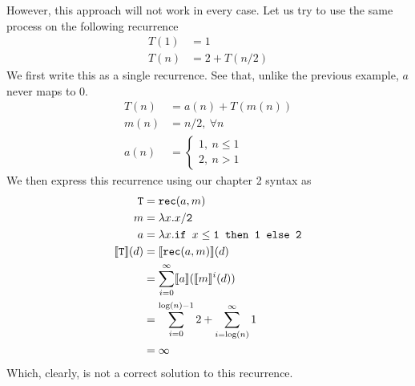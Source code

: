 However, this approach will not work in every case. Let us try to use the same process on the following recurrence
\begin{align*}
T(1) &= 1 \\
T(n) &= 2 + T(n/2) 
\end{align*}
We first write this as a single recurrence. See that, unlike the previous example, $a$ never maps to $0$.
\begin{align*}
T(n) &= a(n) + T(m(n)) \\
m(n) &= n/2, \ \forall n \\ 
a(n) &= 
\begin{cases}
1, \ n \leq 1 \\
2, \ n > 1
\end{cases}
\end{align*}
We then express this recurrence using our chapter 2 syntax as
\begin{align*}
\texttt{T} &= \texttt{rec}(a,m) \\
m &= \lambda x.x/\texttt{2} \\
a &=\lambda x.\texttt{if } x\leq\texttt{1} \texttt{ then } \texttt{1} \texttt{ else } \texttt{2} \\
\llbracket \texttt{T} \rrbracket(d) &= \llbracket \texttt{rec}(a,m) \rrbracket(d) \\
&= \sum_{i=0}^{\infty}\llbracket a \rrbracket(\llbracket m\rrbracket^i(d)) \\
&= \sum_{i=0}^{\log(n)-1} 2 + \sum_{i=\log(n) }^{\infty} 1 \\
&= \infty
\end{align*}
Which, clearly, is not a correct solution to this recurrence.

